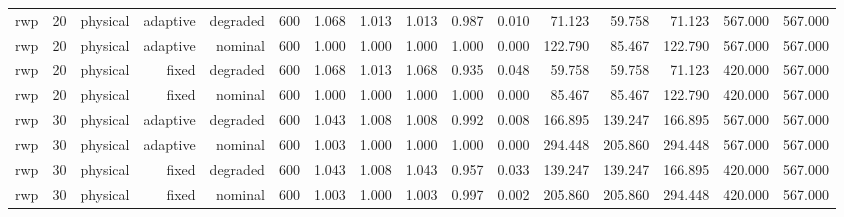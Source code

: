 \begin{tabular}{lrrrrrrrrrrrrrrr}
rwp & 20 & physical & adaptive & degraded & 600 & 1.068 & 1.013 & 1.013 & 0.987 & 0.010 & 71.123 & 59.758 & 71.123 & 567.000 & 567.000 \\
rwp & 20 & physical & adaptive & nominal & 600 & 1.000 & 1.000 & 1.000 & 1.000 & 0.000 & 122.790 & 85.467 & 122.790 & 567.000 & 567.000 \\
rwp & 20 & physical & fixed & degraded & 600 & 1.068 & 1.013 & 1.068 & 0.935 & 0.048 & 59.758 & 59.758 & 71.123 & 420.000 & 567.000 \\
rwp & 20 & physical & fixed & nominal & 600 & 1.000 & 1.000 & 1.000 & 1.000 & 0.000 & 85.467 & 85.467 & 122.790 & 420.000 & 567.000 \\
rwp & 30 & physical & adaptive & degraded & 600 & 1.043 & 1.008 & 1.008 & 0.992 & 0.008 & 166.895 & 139.247 & 166.895 & 567.000 & 567.000 \\
rwp & 30 & physical & adaptive & nominal & 600 & 1.003 & 1.000 & 1.000 & 1.000 & 0.000 & 294.448 & 205.860 & 294.448 & 567.000 & 567.000 \\
rwp & 30 & physical & fixed & degraded & 600 & 1.043 & 1.008 & 1.043 & 0.957 & 0.033 & 139.247 & 139.247 & 166.895 & 420.000 & 567.000 \\
rwp & 30 & physical & fixed & nominal & 600 & 1.003 & 1.000 & 1.003 & 0.997 & 0.002 & 205.860 & 205.860 & 294.448 & 420.000 & 567.000 \\
\bottomrule
\end{tabular}